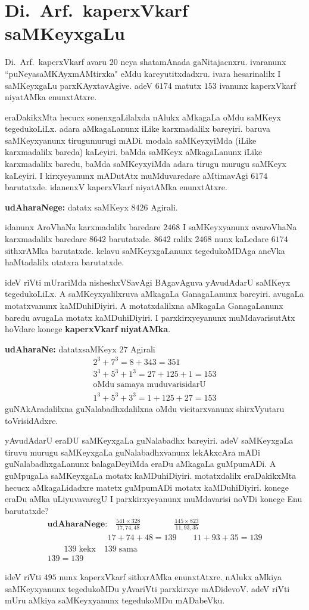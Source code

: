 \chapter{Di.~Arf.\ kaperxVkarf saMKeyxgaLu}

Di.~Arf.\ kaperxVkarf avaru $20$ neya shatamAnada gaNitajacnxru. ivaranunx ``puNeya\break saMKAyxmAMtirxka" eMdu kareyutitxdadxru. ivara hesarinalilx I saMKeyxgaLu parxKAyxta\-vAgive. adeV $6174$ matutx $153$ ivanunx kaperxVkarf niyatAMka enunxtAtxre.

eraDakikxMta hecucx sonenxgaLilalxda nAlukx aMkagaLa oMdu saMKeyx tegedukoLiLx. adara aMkagaLanunx iLike karxmadalilx bareyiri. baruva saMKeyxyanunx tirugumurugi mADi. modala saMKeyxyiMda (iLike karxmadalilx bareda) kaLeyiri. baMda saMKeyx aMkagaLanunx iLike karxmadalilx baredu, baMda saMKeyxyiMda adara tirugu murugu saMKeyx kaLeyiri. I kirxyeyanunx mADutAtx muMduvaredare aMtimavAgi $6174$ barutatxde. idanenxV kaperxVkarf niyatAMka enunxtAtxre.

\textbf{udAharaNege:}\; datatx saMKeyx $8426$ Agirali.

idanunx AroVhaNa karxmadalilx baredare $2468$ I saMKeyxyanunx avaroVhaNa karxmadalilx baredare $8642$ barutatxde. $8642$ ralilx $2468$ nunx kaLedare $6174$ sithxrAMka barutatxde. kelavu saMKeyxgaLanunx tegedukoMDAga aneVka haMtadalilx utatxra barutatxde.

ideV riVti mUrariMda nisheshxVSavAgi BAgavAguva yAvudAdarU saMKeyx tegedu\-koLiLx. A saMKeyxyalilxruva aMkagaLa GanagaLanunx bareyiri. avugaLa motatxvanunx kaMDu\-hiDiyiri. A motatxdalilxna aMkagaLa GanagaLanunx baredu avugaLa motatx kaMDu\-hiDiyiri. I parxkirxyeyanunx muMdavarisutAtx hoVdare konege \textbf{ kaperxVkarf niyatAMka}. 

\textbf{udAharaNe:}\; datatxsaMKeyx $27$ Agirali
\begin{gather*}
2^3+7^3 = 8+343 = 351\\
3^3+5^3+1^3 = 27+125+1 = 153\\
\text{oMdu samaya muduvarisidarU}\\
1^3+5^3+3^3 = 1+125+27 = 153
\end{gather*}
guNAkAradalilxna guNalabadhxdalilxna oMdu vicitarxvanunx shirxVyutaru toVrisidAdxre.

yAvudAdarU eraDU saMKeyxgaLa guNalabadhx bareyiri. adeV saMKeyxgaLa tiruvu murugu saMKeyxgaLa guNalabadhxvanunx lekAkxcAra mADi guNalabadhxgaLanunx balagaDeyiMda eraDu aMkagaLa guMpumADi. A guMpugaLa saMKeyxgaLa motatx kaMDuhiDiyiri. motatxdalilx eraDakikxMta hecucx aMkagaLidadxre matetx guMpumADi motatx kaMDuhiDiyiri. konege eraDu aMka uLiyuvavaregU I parxkirxyeyanunx muMdavarisi noVDi konege Enu barutatxde?
\begin{gather*}
\textbf{udAharaNege:}\quad \frac{541\times 328}{17,74,48} \qquad\qquad \frac{145 \times 823}{11,93,35}\\
\phantom{\text{udAharaNege:}}\quad 17+74+48 = 139 \qquad 11+93+35 = 139\\
\qquad 139\;\text{kekx} \quad 139\; \text{sama}\\
139 = 139
\end{gather*}

ideV riVti $495$ nunx  kaperxVkarf sithxrAMka enunxtAtxre. nAlukx aMkiya saMKeyxyanunx tegedukoMDu yAvariVti parxkirxye mADidevoV. adeV riVti mUru aMkiya saMKeyxyanunx tegedukoMDu mADabeVku.

